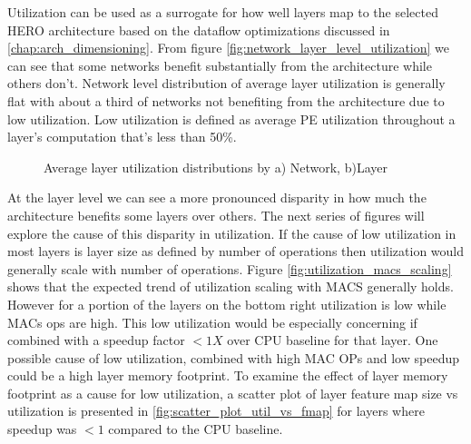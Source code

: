 Utilization can be used as a surrogate for how well layers map to the selected
HERO architecture based on the dataflow optimizations discussed in
\autoref{chap:arch_dimensioning}. From figure
\autoref{fig:network_layer_level_utilization} we can see that some networks benefit substantially from the architecture while
others don't. Network level distribution of average layer utilization is generally flat with
about a third of networks not benefiting from the architecture due to low
utilization. Low utilization is defined as average PE utilization throughout a
layer's computation that's less than 50\%.  


\begin{figure}
    \centering
    \hspace{0.1cm} 
    \caption{Average layer utilization distributions by a) Network, b)Layer}
    \label{fig:network_layer_level_utilization}
\end{figure}

At the layer level we can see a more pronounced disparity in how much the
architecture benefits some layers over others. The next series of figures will
explore the cause of this disparity in utilization. If the cause of low
utilization in most layers is layer size as defined by number of operations then
utilization would generally scale with number of operations. Figure
\autoref{fig:utilization_macs_scaling} shows that the expected trend of
utilization scaling with MACS generally holds. However for a portion of the
layers on the bottom right utilization is low while MACs ops are high. This low
utilization would be especially concerning if combined with a speedup factor
$<1X$ over CPU baseline for that layer. One possible cause of low utilization,
combined with high MAC OPs and low speedup could be a high layer memory
footprint. To examine the effect of layer memory footprint as a cause for low
utilization, a scatter plot of layer feature map size vs utilization is
presented in \autoref{fig:scatter_plot_util_vs_fmap} for layers where speedup
was $<1$ compared to the CPU baseline. 


